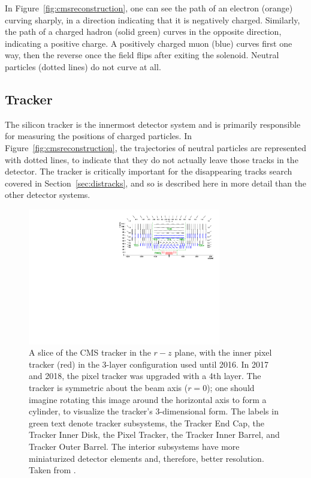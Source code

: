   In Figure~\ref{fig:cmsreconstruction}, one can see the path of an electron (orange) curving sharply, in a direction indicating that it is negatively charged.
  Similarly, the path of a charged hadron (solid green) curves in the opposite direction, indicating a positive charge.
  A positively charged muon (blue) curves first one way, then the reverse once the field flips after exiting the solenoid.
  Neutral particles (dotted lines) do not curve at all.

  \subsection{Tracker} \label{sec:tracker}

  The silicon tracker is the innermost detector system and is primarily responsible for measuring the positions of charged particles.  
  In Figure~\ref{fig:cmsreconstruction}, the trajectories of neutral particles are represented with dotted lines, to indicate that they do not actually leave those tracks in the detector.
  The tracker is critically important for the disappearing tracks search covered in Section~\ref{sec:distracks}, and so is described here in more detail than the other detector systems.

  \begin{figure}[h!]
    \centering
    \includegraphics[width=0.75\textwidth]{figures/TrackerLayout.pdf}
    \caption[Layout of the tracker up to 2016.]{
      A slice of the CMS tracker in the $r-z$ plane, with the inner pixel tracker (red) in the 3-layer configuration used until 2016.
      In 2017 and 2018, the pixel tracker was upgraded with a 4th layer.
      The tracker is symmetric about the beam axis ($r=0$); one should imagine rotating this image around the horizontal axis to form a cylinder, to visualize the tracker's 3-dimensional form.
      The labels in green text denote tracker subsystems, the Tracker End Cap, the Tracker Inner Disk, the Pixel Tracker, the Tracker Inner Barrel, and Tracker Outer Barrel.
      The interior subsystems have more miniaturized detector elements and, therefore, better resolution.
      Taken from \cite{cmstracking}.}
    \label{fig:trackerlayout}
  \end{figure}  

